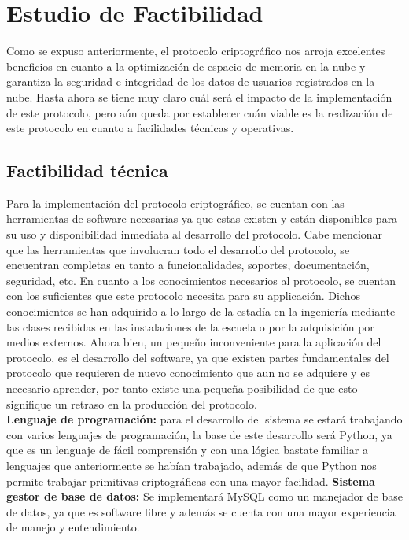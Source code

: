 

\section{Estudio de Factibilidad}

Como se expuso anteriormente, el protocolo criptográfico nos arroja excelentes beneficios en cuanto a la optimización de espacio de memoria en la nube y garantiza la seguridad e integridad de los datos de usuarios registrados en la nube. Hasta ahora se tiene muy claro cuál será el impacto de la implementación de este protocolo, pero aún queda por establecer cuán viable es la realización de este protocolo en cuanto a facilidades técnicas y operativas.


\subsection{Factibilidad técnica}

Para la implementación del protocolo criptográfico, se cuentan con las herramientas de software necesarias ya que estas existen y están disponibles para su uso y disponibilidad inmediata al desarrollo del protocolo. Cabe mencionar que las herramientas que involucran todo el desarrollo del protocolo, se encuentran completas en tanto a funcionalidades, soportes, documentación, seguridad, etc. 
En cuanto a los conocimientos necesarios al protocolo, se cuentan con los suficientes que este protocolo necesita para su applicación. Dichos conocimientos se han adquirido a lo largo de la estadía en la ingeniería mediante las clases recibidas en las instalaciones de la  escuela o por la adquisición por medios externos. Ahora bien, un pequeño inconveniente para la aplicación del protocolo, es el desarrollo del software, ya que existen partes fundamentales del protocolo que requieren de nuevo conocimiento que aun no se adquiere y es necesario aprender, por tanto existe una pequeña posibilidad de que esto signifique un retraso en la producción del protocolo. 
\\
\textbf{Lenguaje de programación:} para el desarrollo del sistema se estará trabajando con varios lenguajes de programación, la base de este desarrollo será Python, ya que es un lenguaje de fácil comprensión y con una lógica bastate familiar a lenguajes que anteriormente se habían trabajado, además de que Python nos permite trabajar primitivas criptográficas con una mayor facilidad.
\textbf{Sistema gestor de base de datos:} Se implementará MySQL como un manejador de base de datos, ya que es software libre y además se cuenta con una mayor experiencia de manejo y entendimiento. 

